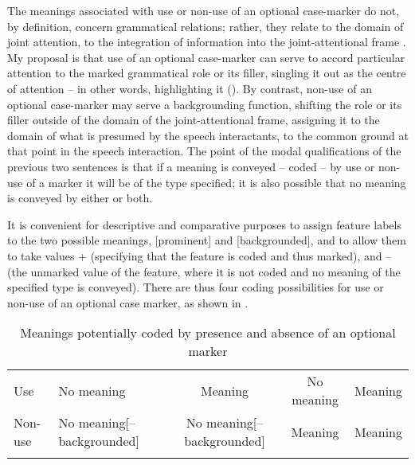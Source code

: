 \documentclass[output=paper]{LSP/langsci}
\begin{document}
The meanings associated with use or non-use of an optional case-marker do not, by definition, concern grammatical relations; rather, they relate to the domain of joint attention, to the integration of information into the joint-attentional frame \citep{Tomaselloetal1986Joint,Tomasello2003Constructing}. My proposal is that use of an optional case-marker can serve to accord particular attention to the marked grammatical role or its filler, singling it out as the centre of attention – in other words, highlighting it (\citealt[1157]{McGregor2013Optionality}). By contrast, non-use of an optional case-marker may serve a backgrounding function, shifting the role or its filler outside of the domain of the joint-attentional frame, assigning it to the domain of what is presumed by the speech interactants, to the common ground at that point in the speech interaction. The point of the modal qualifications of the previous two sentences is that if a meaning is conveyed – \ie coded – by use or non-use of a marker it will be of the type specified; it is also possible that no meaning is conveyed by either or both.

It is convenient for descriptive and comparative purposes to assign feature labels to the two possible meanings, [prominent] and [backgrounded], and to allow them to take values + (specifying that the feature is coded and thus marked), and – (the unmarked value of the feature, where it is not coded and no meaning of the specified type is conveyed). There are thus four coding possibilities for use or non-use of an optional case marker, as shown in .

\begin{table}
\caption{Meanings potentially coded by presence and absence of an optional marker}\label{09-mc-tab:5}
\small
\begin{tabularx}{\textwidth}{p{1cm}LCCC}
\lsptoprule
Use & No meaning\newline [–prominent] & Meaning\newline [+prominent] & No meaning\newline [–prominent] & Meaning \newline [+prominent]\\
\tablevspace
Non-use & No meaning\newline \mbox{[–backgrounded]} & No meaning\newline \mbox{[–backgrounded]} & Meaning\newline [+backgrounded] & Meaning\newline [+backgrounded]\\
\lspbottomrule
\end{tabularx}
\end{table}
\end{document}
